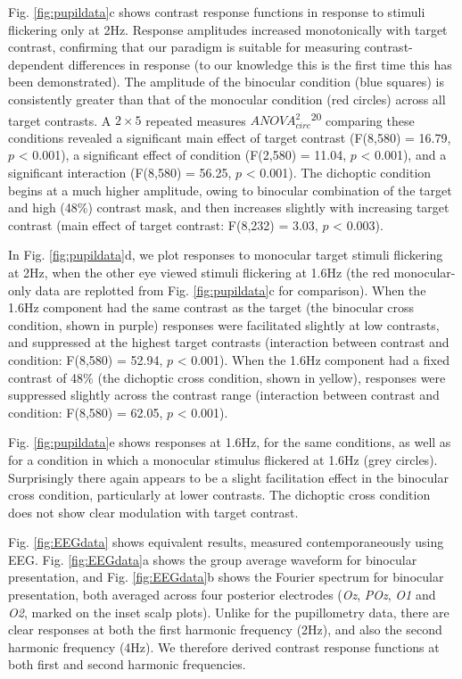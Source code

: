 \documentclass[
]{article}
\begin{document}
Fig. \ref{fig:pupildata}c shows contrast response functions in response to stimuli flickering only at 2Hz. Response amplitudes increased monotonically with target contrast, confirming that our paradigm is suitable for measuring contrast-dependent differences in response (to our knowledge this is the first time this has been demonstrated). The amplitude of the binocular condition (blue squares) is consistently greater than that of the monocular condition (red circles) across all target contrasts. A \(2\times5\) repeated measures \(ANOVA^2_{circ}\)\textsuperscript{20} comparing these conditions revealed a significant main effect of target contrast (F(8,580) = 16.79, \(p\) \textless{} 0.001), a significant effect of condition (F(2,580) = 11.04, \(p\) \textless{} 0.001), and a significant interaction (F(8,580) = 56.25, \(p\) \textless{} 0.001). The dichoptic condition begins at a much higher amplitude, owing to binocular combination of the target and high (48\%) contrast mask, and then increases slightly with increasing target contrast (main effect of target contrast: F(8,232) = 3.03, \(p\) \textless{} 0.003).

In Fig. \ref{fig:pupildata}d, we plot responses to monocular target stimuli flickering at 2Hz, when the other eye viewed stimuli flickering at 1.6Hz (the red monocular-only data are replotted from Fig. \ref{fig:pupildata}c for comparison). When the 1.6Hz component had the same contrast as the target (the binocular cross condition, shown in purple) responses were facilitated slightly at low contrasts, and suppressed at the highest target contrasts (interaction between contrast and condition: F(8,580) = 52.94, \(p\) \textless{} 0.001). When the 1.6Hz component had a fixed contrast of 48\% (the dichoptic cross condition, shown in yellow), responses were suppressed slightly across the contrast range (interaction between contrast and condition: F(8,580) = 62.05, \(p\) \textless{} 0.001).

Fig. \ref{fig:pupildata}e shows responses at 1.6Hz, for the same conditions, as well as for a condition in which a monocular stimulus flickered at 1.6Hz (grey circles). Surprisingly there again appears to be a slight facilitation effect in the binocular cross condition, particularly at lower contrasts. The dichoptic cross condition does not show clear modulation with target contrast.

Fig. \ref{fig:EEGdata} shows equivalent results, measured contemporaneously using EEG. Fig. \ref{fig:EEGdata}a shows the group average waveform for binocular presentation, and Fig. \ref{fig:EEGdata}b shows the Fourier spectrum for binocular presentation, both averaged across four posterior electrodes (\emph{Oz}, \emph{POz}, \emph{O1} and \emph{O2}, marked on the inset scalp plots). Unlike for the pupillometry data, there are clear responses at both the first harmonic frequency (2Hz), and also the second harmonic frequency (4Hz). We therefore derived contrast response functions at both first and second harmonic frequencies.
\end{document}
